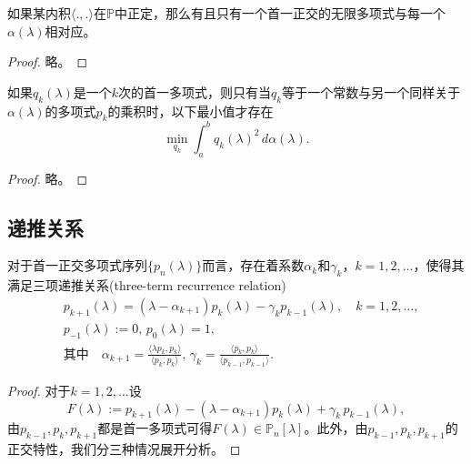 \begin{subappendices}
\begin{theorem}[正交多项式的存在性]
  如果某内积$\langle.,.\rangle$在$\mathbb{P}$中正定，那么有且只有一个首一正交的无限多项式与每一个$\alpha(\lambda)$相对应。
\end{theorem}
\begin{proof}
  略。
\end{proof}

\begin{theorem}[正交多项式的最小化特性]
  如果$q_k(\lambda)$是一个$k$次的首一多项式，则只有当$q_k$等于一个常数与另一个同样关于$\alpha(\lambda)$的多项式$p_k$的乘积时，以下最小值才存在
  \begin{equation*}
    \min_{q_k} \int_a^b q_k(\lambda)^2 \, d \alpha(\lambda).
  \end{equation*}
\end{theorem}
\begin{proof}
  略。
\end{proof}

\subsection{递推关系}
\begin{theorem}[首一正交多项式的三项递推关系]
  \label{theorem:poly-recurrence-relation}
  对于首一正交多项式序列$\{ p_{n} (\lambda) \}$而言，存在着系数$\alpha_k$和$\gamma_k$，$k=1,2,\ldots$，使得其满足三项递推关系(three-term recurrence relation)
  \begin{equation}
    \label{eq:poly-monic-poly-recurrence-def}
    \begin{split}
      &p_{k+1}(\lambda) = \left( \lambda - \alpha_{k+1} \right) p_{k}(\lambda) - \gamma_k p_{k-1}(\lambda) , \quad k = 1,2,\ldots, \\
      &p_{-1}(\lambda) :=0, \, p_{0}(\lambda) = 1, \\
      &\text{其中} \quad \alpha_{k+1} = \frac{\langle \lambda p_k, p_k \rangle}{\langle p_k,p_k \rangle}, \, \gamma_k = \frac{\langle p_k,p_k \rangle }{ \langle p_{k-1},p_{k-1} \rangle}.
    \end{split}
  \end{equation}
\end{theorem}

\begin{proof}
  对于$k =1,2,\ldots$设
  \begin{equation*}
    F(\lambda) := p_{k+1}(\lambda) - (\lambda - \alpha_{k+1}) p_{k}(\lambda) + \gamma_k \, p_{k-1}(\lambda),
  \end{equation*}
  由$p_{k-1},p_k,p_{k+1}$都是首一多项式可得$F(\lambda) \in \mathbb{P}_{n}[\lambda]$。此外，由$p_{k-1},p_k,p_{k+1}$的正交特性，我们分三种情况展开分析。


\end{proof}
\end{subappendices}
